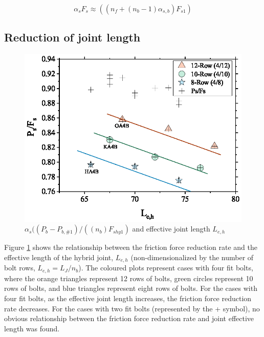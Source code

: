 \begin{equation}
    \alpha_s F_s \approx ((n_f+ (n_b-1)\alpha_{s,b}) F_{s1} ) 
    \label{eq-intr-as}
\end{equation}


\subsection{Reduction of joint length}

\begin{figure}[htbp]
    \centering
    \includegraphics[width=0.65\linewidth]{imgs/ch7/as-leh.eps}
    \caption{ $\alpha_s ((P_b-P_{b,\#1})/((n_b)F_{shy1})$ and effective joint length $L_{e,h}$}
    \label{fig-rdc-leh}
\end{figure}

Figure \ref{fig-rdc-leh} shows the relationship between the friction force reduction rate and the effective length of the hybrid joint, $L_{e,h}$ (non-dimensionalized by the number of bolt rows, $L_{e,h} = L_J / n_b$). The coloured plots represent cases with four fit bolts, where the orange triangles represent 12 rows of bolts, green circles represent 10 rows of bolts, and blue triangles represent eight rows of bolts. For the cases with four fit bolts, as the effective joint length increases, the friction force reduction rate decreases. For the cases with two fit bolts (represented by the + symbol), no obvious relationship between the friction force reduction rate and joint effective length was found. 






